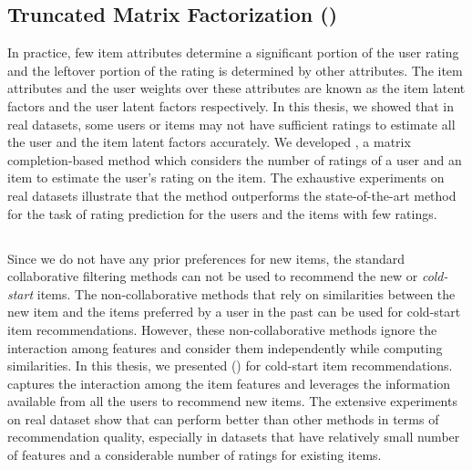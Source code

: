 \subsection*{Truncated Matrix Factorization (\TMF)}
In practice, few item attributes determine a significant portion of the user rating and the leftover portion
of the rating is determined by other attributes. The item attributes and the user weights over these attributes
are known as the item latent factors and the user latent factors respectively. In this thesis, we showed that
in real datasets,  some users or items may not have sufficient ratings to estimate all the user and the item
latent factors accurately.
We developed \TMF, a matrix completion-based method which considers the number of ratings of a user and an
item to estimate the user's rating on the item. The exhaustive experiments on real datasets illustrate that
the \TMF method outperforms the state-of-the-art \MF method for the task of rating prediction for the users
and the items with few ratings.



\subsection*{\CFEXPB}
Since we do not have any prior preferences for new items, the standard collaborative filtering methods can
not be used to recommend the new or \emph{cold-start} items. The non-collaborative methods that rely on
similarities between the new item and the items preferred by a user in the past can be used for cold-start
item recommendations. However, these non-collaborative methods ignore the interaction among features and
consider them independently while computing similarities. In this thesis, we presented \CFEXP (\CF) for
cold-start item recommendations. \CF captures the interaction among the item features and leverages the
information available from all the users to recommend new items. 
The extensive experiments on real dataset show that \CF can perform better than other methods in terms of
recommendation quality, especially in datasets that have relatively small number of features and a
considerable number of ratings for existing items.  



